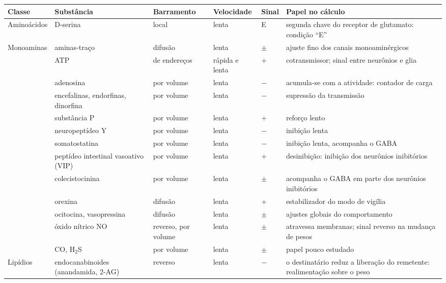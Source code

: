 \begin{table}[t]
\centering
\footnotesize
\setlength{\tabcolsep}{4pt}
\renewcommand{\arraystretch}{1.12}
\begin{tabular}{>{\raggedright}p{2.25cm}>{\raggedright}p{2.8cm}>{\raggedright}p{1.8cm}>{\raggedright}p{1.5cm}>{\centering}p{0.8cm}>{\raggedright\arraybackslash}p{4.3cm}}
\toprule
Classe & Substância & Barramento & Velocidade & Sinal & Papel no cálculo \\
\midrule
Aminoácidos & D-serina & local & lenta & E & segunda chave do receptor de glutamato: condição ``E'' \\
\midrule
Monoaminas & aminas-traço & difusão & lenta & $\pm$ & ajuste fino dos canais monoaminérgicos \\
\midrule
\multirow{2}{2.25cm}{Purinas}
 & ATP & de endereços & rápida e lenta & $+$ & cotransmissor; sinal entre neurônios e glia \\
 & adenosina & por volume & lenta & $-$ & acumula-se com a atividade: contador de carga~\cite{Dunwiddie2001} \\
\midrule
\multirow{8}{2.25cm}{Neuropeptídeos (mais de cem)}
 & encefalinas, endorfinas, dinorfina & por volume & lenta & $-$ & supressão da transmissão \\
 & substância P & por volume & lenta & $+$ & reforço lento \\
 & neuropeptídeo Y & por volume & lenta & $-$ & inibição lenta \\
 & somatostatina & por volume & lenta & $-$ & inibição lenta, acompanha o GABA \\
 & peptídeo intestinal vasoativo (VIP) & por volume & lenta & $+$ & desinibição: inibição dos neurônios inibitórios \\
 & colecistocinina & por volume & lenta & $\pm$ & acompanha o GABA em parte dos neurônios inibitórios \\
 & orexina & difusão & lenta & $+$ & estabilizador do modo de vigília \\
 & ocitocina, vasopressina & difusão & lenta & $\pm$ & ajustes globais do comportamento \\
\midrule
\multirow{2}{2.25cm}{Gases}
 & óxido nítrico NO & reverso, por volume & lenta & $\pm$ & atravessa membranas; sinal reverso na mudança de pesos~\cite{Garthwaite2008} \\
 & CO, H$_2$S & por volume & lenta & $\pm$ & papel pouco estudado \\
\midrule
Lipídios & endocanabinoides (anandamida, 2-AG) & reverso & lenta & $-$ & o destinatário reduz a liberação do remetente: realimentação sobre o peso~\cite{WilsonNicoll2001} \\

\end{tabular}
\end{table}
